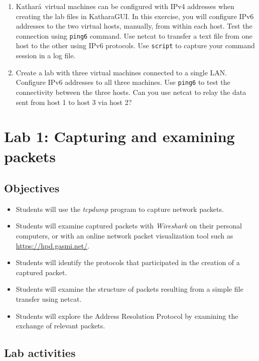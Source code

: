 \documentclass[12pt]{book}
\newcommand{\kathara}{Kathar\'a}
\begin{document}
\begin{enumerate}[1.]
\item \kathara\ virtual machines can be configured with IPv4 addresses
  when creating the lab files in KatharaGUI. In this exercise, you
  will configure IPv6 addresses to the two virtual hosts, manually,
  from within each host. Test the connection using \verb$ping6$
  command. Use netcat to transfer a text file from one host to the
  other using IPv6 protocols. Use \verb$script$ to capture your
  command session in a log file.

\item Create a lab with three virtual machines connected to a single
  LAN. Configure IPv6 addresses to all three machines. Use
  \verb$ping6$ to test the connectivity between the three hosts. Can
  you use netcat to relay the data sent from host 1 to host 3 via host
  2?
\end{enumerate}



\chapter{Lab 1: Capturing and examining packets }\label{tcpdump.se}

\section{Objectives}

\begin{itemize}[--]
\item Students will use the \emph{tcpdump} program to capture network
  packets. 
\item Students will examine captured packets with
  \emph{Wireshark} on their personal computers, or with an online
  network packet visualization tool such as
  \url{https://hpd.gasmi.net/}. 
\item Students will identify the protocols
  that participated in the creation of a captured packet. 
\item Students will examine the structure of packets resulting from a
  simple file transfer using netcat. 
\item Students will explore the 
  Address Resolution Protocol by examining the exchange of relevant
  packets. 

\end{itemize}


\section{Lab activities}
\end{document}
